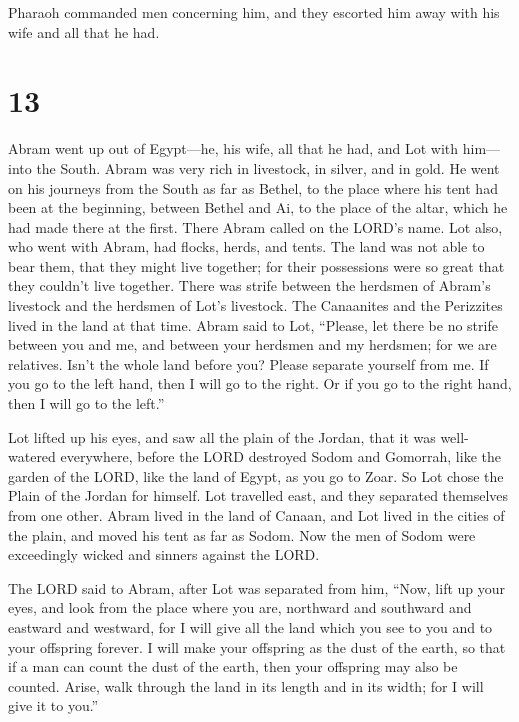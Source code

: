  Pharaoh commanded men concerning him, and they escorted
him away with his wife and all that he had.

\hypertarget{section-12}{%
\section{13}\label{section-12}}

 Abram went up out of Egypt---he, his wife, all that he had,
and Lot with him---into the South.  Abram was very rich in
livestock, in silver, and in gold.  He went on his journeys
from the South as far as Bethel, to the place where his tent had been at
the beginning, between Bethel and Ai,  to the place of the
altar, which he had made there at the first. There Abram called on the
LORD's name.  Lot also, who went with Abram, had flocks,
herds, and tents.  The land was not able to bear them, that
they might live together; for their possessions were so great that they
couldn't live together.  There was strife between the
herdsmen of Abram's livestock and the herdsmen of Lot's livestock. The
Canaanites and the Perizzites lived in the land at that time.
 Abram said to Lot, ``Please, let there be no strife between
you and me, and between your herdsmen and my herdsmen; for we are
relatives.  Isn't the whole land before you? Please separate
yourself from me. If you go to the left hand, then I will go to the
right. Or if you go to the right hand, then I will go to the left.''

 Lot lifted up his eyes, and saw all the plain of the
Jordan, that it was well-watered everywhere, before the LORD destroyed
Sodom and Gomorrah, like the garden of the LORD, like the land of Egypt,
as you go to Zoar.  So Lot chose the Plain of the Jordan
for himself. Lot travelled east, and they separated themselves from one
other.  Abram lived in the land of Canaan, and Lot lived in
the cities of the plain, and moved his tent as far as Sodom.
 Now the men of Sodom were exceedingly wicked and sinners
against the LORD.

 The LORD said to Abram, after Lot was separated from him,
``Now, lift up your eyes, and look from the place where you are,
northward and southward and eastward and westward,  for I
will give all the land which you see to you and to your offspring
forever.  I will make your offspring as the dust of the
earth, so that if a man can count the dust of the earth, then your
offspring may also be counted.  Arise, walk through the
land in its length and in its width; for I will give it to you.''

